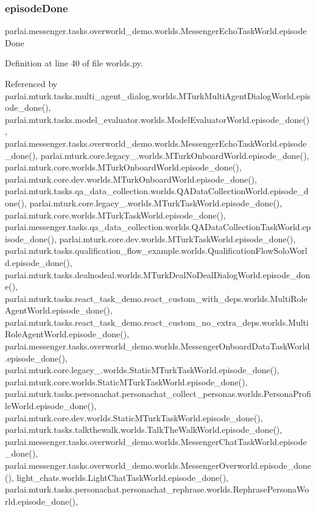 \subsubsection{\texorpdfstring{episode\+Done}{episodeDone}}
{\footnotesize\ttfamily parlai.\+messenger.\+tasks.\+overworld\+\_\+demo.\+worlds.\+Messenger\+Echo\+Task\+World.\+episode\+Done}



Definition at line 40 of file worlds.\+py.



Referenced by parlai.\+mturk.\+tasks.\+multi\+\_\+agent\+\_\+dialog.\+worlds.\+M\+Turk\+Multi\+Agent\+Dialog\+World.\+episode\+\_\+done(), parlai.\+mturk.\+tasks.\+model\+\_\+evaluator.\+worlds.\+Model\+Evaluator\+World.\+episode\+\_\+done(), parlai.\+messenger.\+tasks.\+overworld\+\_\+demo.\+worlds.\+Messenger\+Echo\+Task\+World.\+episode\+\_\+done(), parlai.\+mturk.\+core.\+legacy\+\_.\+worlds.\+M\+Turk\+Onboard\+World.\+episode\+\_\+done(), parlai.\+mturk.\+core.\+worlds.\+M\+Turk\+Onboard\+World.\+episode\+\_\+done(), parlai.\+mturk.\+core.\+dev.\+worlds.\+M\+Turk\+Onboard\+World.\+episode\+\_\+done(), parlai.\+mturk.\+tasks.\+qa\+\_\+data\+\_\+collection.\+worlds.\+Q\+A\+Data\+Collection\+World.\+episode\+\_\+done(), parlai.\+mturk.\+core.\+legacy\+\_.\+worlds.\+M\+Turk\+Task\+World.\+episode\+\_\+done(), parlai.\+mturk.\+core.\+worlds.\+M\+Turk\+Task\+World.\+episode\+\_\+done(), parlai.\+messenger.\+tasks.\+qa\+\_\+data\+\_\+collection.\+worlds.\+Q\+A\+Data\+Collection\+Task\+World.\+episode\+\_\+done(), parlai.\+mturk.\+core.\+dev.\+worlds.\+M\+Turk\+Task\+World.\+episode\+\_\+done(), parlai.\+mturk.\+tasks.\+qualification\+\_\+flow\+\_\+example.\+worlds.\+Qualification\+Flow\+Solo\+World.\+episode\+\_\+done(), parlai.\+mturk.\+tasks.\+dealnodeal.\+worlds.\+M\+Turk\+Deal\+No\+Deal\+Dialog\+World.\+episode\+\_\+done(), parlai.\+mturk.\+tasks.\+react\+\_\+task\+\_\+demo.\+react\+\_\+custom\+\_\+with\+\_\+deps.\+worlds.\+Multi\+Role\+Agent\+World.\+episode\+\_\+done(), parlai.\+mturk.\+tasks.\+react\+\_\+task\+\_\+demo.\+react\+\_\+custom\+\_\+no\+\_\+extra\+\_\+deps.\+worlds.\+Multi\+Role\+Agent\+World.\+episode\+\_\+done(), parlai.\+messenger.\+tasks.\+overworld\+\_\+demo.\+worlds.\+Messenger\+Onboard\+Data\+Task\+World.\+episode\+\_\+done(), parlai.\+mturk.\+core.\+legacy\+\_.\+worlds.\+Static\+M\+Turk\+Task\+World.\+episode\+\_\+done(), parlai.\+mturk.\+core.\+worlds.\+Static\+M\+Turk\+Task\+World.\+episode\+\_\+done(), parlai.\+mturk.\+tasks.\+personachat.\+personachat\+\_\+collect\+\_\+personas.\+worlds.\+Persona\+Profile\+World.\+episode\+\_\+done(), parlai.\+mturk.\+core.\+dev.\+worlds.\+Static\+M\+Turk\+Task\+World.\+episode\+\_\+done(), parlai.\+mturk.\+tasks.\+talkthewalk.\+worlds.\+Talk\+The\+Walk\+World.\+episode\+\_\+done(), parlai.\+messenger.\+tasks.\+overworld\+\_\+demo.\+worlds.\+Messenger\+Chat\+Task\+World.\+episode\+\_\+done(), parlai.\+messenger.\+tasks.\+overworld\+\_\+demo.\+worlds.\+Messenger\+Overworld.\+episode\+\_\+done(), light\+\_\+chats.\+worlds.\+Light\+Chat\+Task\+World.\+episode\+\_\+done(), parlai.\+mturk.\+tasks.\+personachat.\+personachat\+\_\+rephrase.\+worlds.\+Rephrase\+Persona\+World.\+episode\+\_\+done(), 